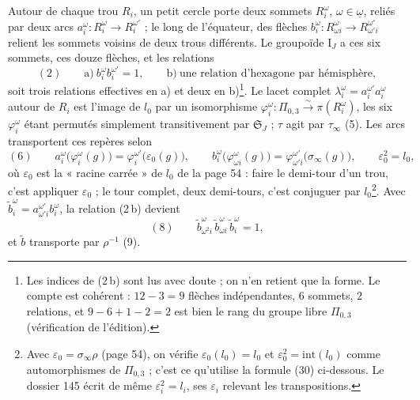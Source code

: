 \documentclass[11pt,a4paper]{article}
\begin{document}
Autour de chaque trou $R_i$, un petit cercle porte deux sommets
$R_i^{\omega}$, $\omega \in \underline{\omega}$, reliés par deux arcs
$a_i^{\omega} : R_i^{\omega} \to R_i^{\omega'}$ ; le long de l'équateur, des
flèches $b_i^{\omega} : R^{\omega}_{\omega i} \to R^{\omega'}_{\omega' i}$
relient les sommets voisins de deux trous différents. Le groupoïde
$\mathrm{I}_J$ a ces six sommets, ces douze flèches, et les relations
\[
(2)\qquad \text{a)}\ b_i^{\omega} b_i^{\omega'} = 1, \qquad
\text{b)}\ \text{une relation d'hexagone par hémisphère},
\]
soit trois relations effectives en a) et deux en b)\footnote{Les indices de
(2\,b) sont lus avec doute ; on n'en retient que la forme. Le compte est
cohérent : $12 - 3 = 9$ flèches indépendantes, $6$ sommets, $2$ relations, et
$9 - 6 + 1 - 2 = 2$ est bien le rang du groupe libre $\Pi_{0,3}$
(vérification de l'édition).}. Le lacet complet $\lambda_i^{\omega} =
a_i^{\omega'} a_i^{\omega}$ autour de $R_i$ est l'image de $l_0$ par un
isomorphisme $\varphi_i^{\omega} : \Pi_{0,3} \xrightarrow{\sim}
\pi(R_i^{\omega})$, les six $\varphi_i^{\omega}$ étant permutés simplement
transitivement par $\mathfrak{S}_J$ ; $\tau$ agit par $\tau_\infty$ (5). Les
arcs transportent ces repères selon
\[
(6)\qquad a_i^{\omega}\bigl(\varphi_i^{\omega}(g)\bigr) = \varphi_i^{\omega'}\bigl(\varepsilon_0(g)\bigr), \qquad
b_i^{\omega}\bigl(\varphi^{\omega}_{\omega i}(g)\bigr) = \varphi^{\omega'}_{\omega' i}\bigl(\sigma_\infty(g)\bigr), \qquad \varepsilon_0^2 = l_0 ,
\]
où $\varepsilon_0$ est la « racine carrée » de $l_0$ de la page 54 : faire le
demi-tour d'un trou, c'est appliquer $\varepsilon_0$ ; le tour complet, deux
demi-tours, c'est conjuguer par $l_0$\footnote{Avec $\varepsilon_0 =
\sigma_\infty \rho$ (page 54), on vérifie $\varepsilon_0(l_0) = l_0$ et
$\varepsilon_0^2 = \mathrm{int}(l_0)$ comme automorphismes de $\Pi_{0,3}$ ;
c'est ce qu'utilise la formule (30) ci-dessous. Le dossier 145 écrit de même
$\varepsilon_i^2 = l_i$, ses $\varepsilon_i$ relevant les transpositions.}.
Avec $\tilde b_i^{\omega} = a^{\omega'}_{\omega' i} b_i^{\omega}$, la relation
(2\,b) devient
\[
(8)\qquad \tilde b^{\omega}_{\omega^2 i}\, \tilde b^{\omega}_{\omega i}\, \tilde b_i^{\omega} = 1 ,
\]
et $\tilde b$ transporte par $\rho^{-1}$ (9).
\end{document}
